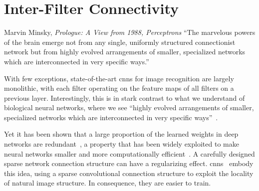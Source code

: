 \documentclass[thesis]{subfiles}
\begin{document}
	\chapter{Inter-Filter Connectivity}\label{deeproots}
	\begin{chapquote}{Marvin Minsky, \textit{Prologue: A View from 1988, Perceptrons}}
	``The marvelous powers of the brain emerge not from any single, uniformly structured connectionist network but from highly evolved arrangements of smaller, specialized networks which are interconnected in very specific ways.''
	\end{chapquote}
	
	With few exceptions, state-of-the-art \glspl{cnn} for image recognition are largely monolithic, with each filter operating on the feature maps of all filters on a previous layer. Interestingly, this is in stark contrast to what we understand of biological neural networks, where we see ``highly evolved arrangements of smaller, specialized networks which are interconnected in very specific ways''~\citep{minsky1988perceptrons}.
	
	Yet it has been shown that a large proportion of the learned weights in deep networks are redundant~\citep{Denil2013predicting}, a property that has been widely exploited to make neural networks smaller and more computationally efficient~\citep{Szegedy2014going,Denton2014efficient}. 
	A carefully designed sparse network connection structure can have a regularizing effect. \Glspl{cnn}~\citep{Fuk80,Lecun1998} embody this idea, using a sparse convolutional connection structure to exploit the locality of natural image structure. In consequence, they are easier to train.
	
\end{document}
